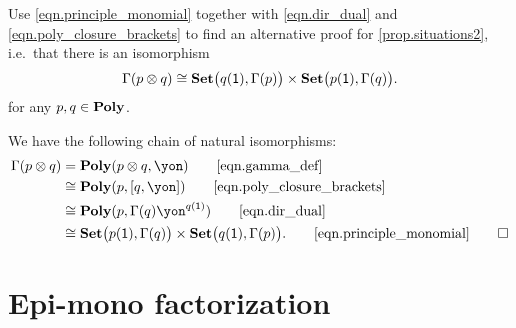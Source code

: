 \documentclass[Book-Poly]{subfiles}
\begin{document}
\begin{exercise}
Use \eqref{eqn.principle_monomial} together with \eqref{eqn.dir_dual} and \eqref{eqn.poly_closure_brackets} to find an alternative proof for \cref{prop.situations2}, i.e.\ that there is an isomorphism
\[
    \Gamma(p\otimes q) \cong \mathbf{Set}\big(q(\textsf{1}),\Gamma(p)\big) \times \mathbf{Set}\big(p(\textsf{1}),\Gamma(q)\big).
\]
for any $p,q\in\mathbf{Poly}$.
\begin{solution}
We have the following chain of natural isomorphisms:
\begin{align*}
	\Gamma(p \otimes q) &=
	\poly(p \otimes q,\yon) 
	\tag*{\eqref{eqn.gamma_def}} \\
	&\iso
	\poly(p, \ihom{q,\yon}) 
	\tag*{\eqref{eqn.poly_closure_brackets}} \\
	&\iso
	\poly(p, \Gamma(q)\yon^{q(\1)})
	\tag*{\eqref{eqn.dir_dual}} \\
	&\iso
	\smset\big(p(\1),\Gamma(q)\big) \times \smset\big(q(\1),\Gamma(p)\big).
	\tag*{\eqref{eqn.principle_monomial}}
\qedhere
\end{align*}
\end{solution}
\end{exercise}

\section{Epi-mono factorization}
\end{document}
